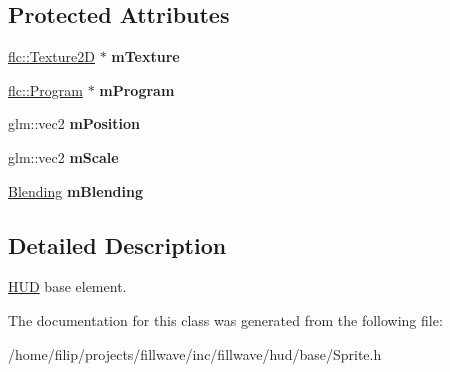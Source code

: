 \subsection*{Protected Attributes}
\begin{DoxyCompactItemize}
\item 
\mbox{\label{classflw_1_1flf_1_1Sprite_a3bf47fa8e61522bc7a2488188aa585c6}} 
\hyperlink{classflw_1_1flc_1_1Texture2D}{flc\+::\+Texture2D} $\ast$ {\bfseries m\+Texture}
\item 
\mbox{\label{classflw_1_1flf_1_1Sprite_ada93ce7705f51fd95637ec20720edeae}} 
\hyperlink{classflw_1_1flc_1_1Program}{flc\+::\+Program} $\ast$ {\bfseries m\+Program}
\item 
\mbox{\label{classflw_1_1flf_1_1Sprite_ad86c9a3fc6970fdf5d9145757cc58d11}} 
glm\+::vec2 {\bfseries m\+Position}
\item 
\mbox{\label{classflw_1_1flf_1_1Sprite_ac01e8cda1c091548cd41e8861311e13a}} 
glm\+::vec2 {\bfseries m\+Scale}
\item 
\mbox{\label{classflw_1_1flf_1_1Sprite_aa7e38483fb61abad6bd9dc9041c5ac5d}} 
\hyperlink{structflw_1_1flf_1_1Blending}{Blending} {\bfseries m\+Blending}
\end{DoxyCompactItemize}


\subsection{Detailed Description}
\hyperlink{classflw_1_1flf_1_1HUD}{H\+UD} base element. 

The documentation for this class was generated from the following file\+:\begin{DoxyCompactItemize}
\item 
/home/filip/projects/fillwave/inc/fillwave/hud/base/Sprite.\+h\end{DoxyCompactItemize}
